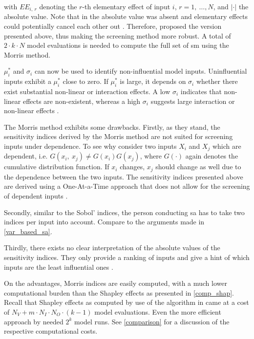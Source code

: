 \noindent with $EE_{i,\ r}$ denoting the $r$-th elementary effect of input $i$, $r = 1,\ \dots, N$, and $\vert \cdot \vert$ the absolute value. Note that in \citet{M91} the absolute value was absent and elementary effects could potentially cancel each other out \citep{CCS07}. Therefore, \citet{CCS07} proposed the version presented above, thus making the screening method more robust. A total of $2 \cdot k \cdot N$ model evaluations is needed to compute the full set of sm using the Morris method.

$\mu_i^\ast$ and $\sigma_i$ can now be used to identify non-influential model inputs. Uninfluential inputs exhibit a $\mu_i^\ast$ close to zero. If $\mu_i^\ast$ is large, it depends on $\sigma_i$ whether there exist substantial non-linear or interaction effects. A low $\sigma_i$ indicates that non-linear effects are non-existent, whereas a high $\sigma_i$ suggests large interaction or non-linear effects \citep{GM17}.

The Morris method exhibits some drawbacks. Firstly, as they stand, the sensitivity indices derived by the Morris method are not suited for screening inputs under dependence. To see why consider two inputs $X_i$ and $X_j$ which are dependent, i.e. $G(x_i,\ x_j) \neq G(x_i)G(x_j)$, where $G(\cdot)$ again denotes the cumulative distribution function. If $x_i$ changes, $x_j$ should change as well due to the dependence between the two inputs. The sensitivity indices presented above are derived using a One-At-a-Time approach that does not allow for the screening of dependent inputs \citep{GM17}.

Secondly, similar to the Sobol' indices, the person conducting sa has to take two indices per input into account. Compare to the arguments made in \cref{var_based_sa}.

Thirdly, there exists no clear interpretation of the absolute values of the sensitivity indices. They only provide a ranking of inputs and give a hint of which inputs are the least influential ones \citep{GM17}.

On the advantages, Morris indices are easily computed, with a much lower computational burden than the Shapley effects as presented in \cref{comp_shap}. Recall that Shapley effects as computed by use of the algorithm in \citet{SNS16} came at a cost of $N_V+m \cdot N_I \cdot N_O \cdot (k-1)$ model evaluations. Even the more efficient approach by \citet{PRB20} needed $2^k$ model runs. See \cref{comparison} for a discussion of the respective computational costs.

